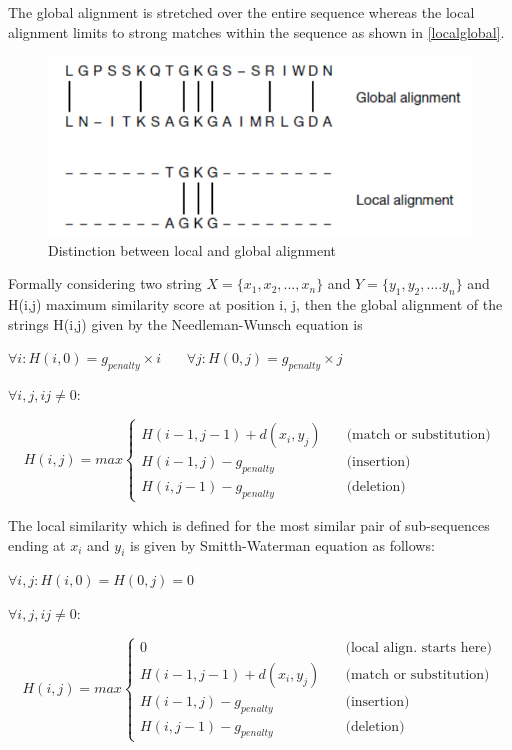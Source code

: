 \documentclass[12pt,twoside]{article}
\begin{document}
The global alignment is stretched over the entire sequence whereas the local alignment limits to strong matches within
the sequence as shown in \cref{localglobal}. 

\begin{figure}%
    \centering
    \includegraphics[width=0.\textwidth]{fig/localglobal}
    \caption{Distinction between local and global alignment \cite[Figure 3.1]{mount_bioinformatics:_2004}}
    \label{fig:localglobal}
\end{figure}

Formally considering two string $ X = \{x_1, x_2, ..., x_n\} $ and $Y = \{y_1, y_2, .... y_n\}$
and H(i,j) maximum similarity score at position i, j, then the global alignment of the strings H(i,j) given by
the Needleman-Wunsch equation \cite{needleman_general_1970} is 

\( \forall i :  H(i,0) = g_{penalty} \times i \) \,\,\,\,\,\,\, \( \forall j :  H(0,j) = g_{penalty} \times j \)

\( \forall i,j,ij \neq 0: \)

\[ H(i,j) =  max
\begin{cases}	
	H(i - 1, j - 1) + d(x_i, y_j) & \quad \text{(match or substitution)} \\
	H(i - 1, j) - g_{penalty} 	  & \quad \text{(insertion)}\\
	H(i, j - 1) - g_{penalty}     & \quad \text{(deletion)}
\end{cases}
\]

The local similarity which is defined for the most similar pair of sub-sequences ending at $x_i$ and $y_i$ is given by
Smitth-Waterman \cite{smith_identification_1981} equation as follows:

\( \forall i,j :  H(i,0) = H(0,j) = 0 \)

\( \forall i,j,ij \neq 0: \)

\[ H(i,j) =  max
\begin{cases}
	0							  & \quad \text{(local align. starts here)} \\
	H(i - 1, j - 1) + d(x_i, y_j) & \quad \text{(match or substitution)} \\
	H(i - 1, j) - g_{penalty} 	  & \quad \text{(insertion)}\\
	H(i, j - 1) - g_{penalty}     & \quad \text{(deletion)}
\end{cases}
\]
\end{document}
